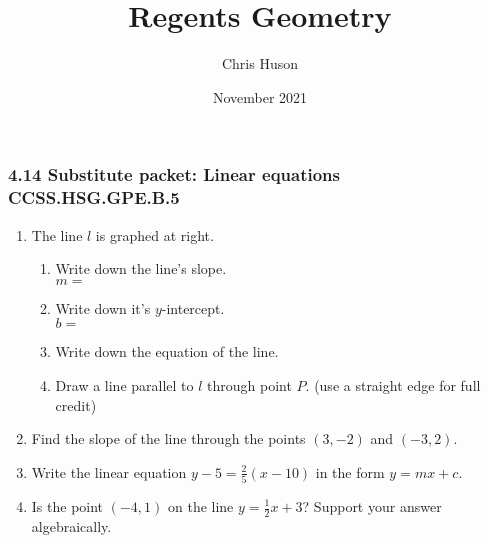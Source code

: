 \documentclass[12pt, twoside]{article}
\title{Regents Geometry}
\author{Chris Huson}
\date{November 2021}
\begin{document}
\subsubsection*{4.14 Substitute packet: Linear equations \hfill CCSS.HSG.GPE.B.5}
\begin{enumerate}
\item The line $l$ is graphed at right.
\begin{multicols}{2}
\begin{enumerate}
  \item Write down the line's slope.\\ $m=$
  \vspace{0.5cm}
  \item Write down it's $y$-intercept.\\ $b=$
  \vspace{0.5cm}
  \item Write down the equation of the line.
  \vspace{1.5cm}
  \item Draw a line parallel to $l$ through point $P$. (use a straight edge for full credit)
\end{enumerate} \vspace{.5cm}
  \begin{center} 
  \end{center}
\end{multicols}

\item Find the slope of the line through the points $(3, -2)$ and $(-3, 2)$. \vspace{4cm}

\item Write the linear equation $\displaystyle y-5=\frac{2}{5}(x-10)$ in the form $y=mx+c$. \vspace{4cm}

\item Is the point $(-4,1)$ on the line $\displaystyle y=\frac{1}{2}x+3$? Support your answer algebraically.


\end{enumerate}
\end{document}
